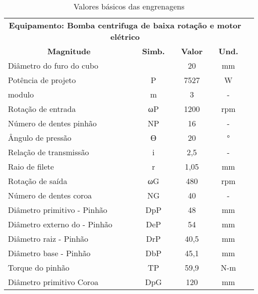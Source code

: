 \begin{table}[]
\centering
\caption{\label{tab:3} Valores básicos das engrenagens}
\begin{tabular}{l c c c c}
\hline
\multicolumn{4}{c}{\textbf{Equipamento: Bomba centrifuga de baixa rotação e motor elétrico}} \\
\multicolumn{1}{c}{\textbf{Magnitude}}  & \textbf{Simb.}  & \textbf{Valor}  & \textbf{Und.}  \\
Diâmetro do furo do cubo                &                & 20              & mm             \\
Potência de projeto                     & P               & 7527            & W              \\
modulo                                  & m               & 3               & -              \\
Rotação de entrada                      & ωP              & 1200            & rpm            \\
Número de dentes pinhão                 & NP              & 16              & -              \\
Ângulo de pressão                       & ϴ              & 20              & °              \\
Relação de transmissão                  & i               & 2,5             & -              \\
Raio de filete                          & r               & 1,05            & mm             \\
Rotação de saída                        & ωG              & 480             & rpm            \\
Número de dentes coroa                  & NG              & 40              & -              \\
Diâmetro primitivo - Pinhão             & DpP             & 48              & mm             \\
Diâmetro externo do - Pinhão            & DeP             & 54              & mm             \\
Diâmetro raiz - Pinhão                  & DrP             & 40,5            & mm             \\
Diâmetro base - Pinhão                  & DbP             & 45,1            & mm             \\
Torque do pinhão                        & TP              & 59,9            & N-m            \\
Diâmetro primitivo Coroa                & DpG             & 120             & mm             \\

\end{tabular}
\end{table}
